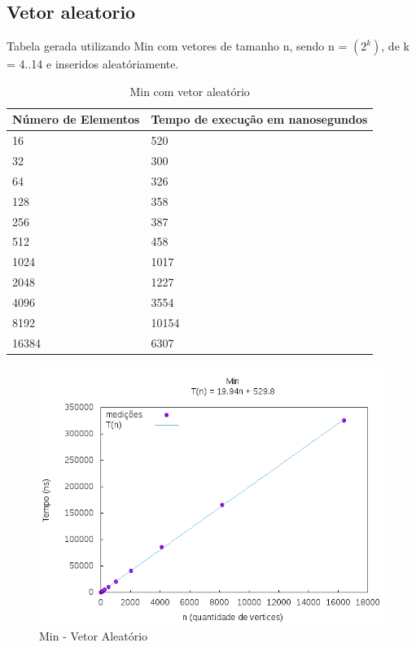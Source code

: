 \documentclass[12pt,a4paper,twoside]{report}
\begin{document}
\subsection{Vetor aleatorio}
Tabela gerada utilizando Min com vetores de tamanho n, sendo n = $(2^k)$, de k = 4..14 e inseridos aleatóriamente.
\begin{table}[H]
\centering
\caption{Min com vetor aleatório}
\label{my-label}
\begin{tabular}{|l|l|}
\hline
\multicolumn{1}{|c|}{\textbf{Número de Elementos}} & \multicolumn{1}{c|}{\textbf{Tempo de execução em nanosegundos}} \\ \hline
16 & 520 \\ \hline
32 & 300 \\ \hline
64 & 326 \\ \hline
128 & 358 \\ \hline
256 & 387 \\ \hline
512 & 458 \\ \hline
1024 & 1017 \\ \hline
2048 & 1227 \\ \hline
4096 & 3554 \\ \hline
8192 & 10154 \\ \hline
16384 & 6307 \\ \hline

\end{tabular}
\end{table}

\begin{figure}[H]
    \centering
    \includegraphics[width=0.7\linewidth]{graficos/Min/Aleatorio/Min.png}
  \caption{Min - Vetor Aleatório}
\end{figure}
\end{document}
